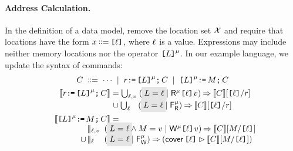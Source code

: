 \paragraph{Address Calculation.}
In the definition of a data model, remove the location set $\mathcal{X}$ and require
that locations have the form $x\!\!\;\mathrel{\mathord{\vcentcolon}\mkern-1mu\mathord{\vcentcolon}\mathord{{=}}}\;\!\!\texttt{[}\ell\texttt{]}$, where $\ell$
is a value.  Expressions may include neither memory locations nor the
operator $\texttt{[}L\texttt{]}^{\mu}$.
In our example language, we update the syntax of commands:
\begin{gather*}
  \aCmd
  \BNFDEF \cdots
  \BNFSEP \aReg\GETS\REF{\cExp}^{\amode}\SEMI \aCmd 
  \BNFSEP \REF{\cExp}^{\amode}\GETS\aExp\SEMI \aCmd
  \\
\begin{aligned}
  \sem{\aReg\GETS\REF{\cExp}^\amode\SEMI \aCmd} & =
  \textstyle\bigcup_{\cVal,\aVal}\; (\;\mathhl{\cExp=\cVal} \mid \DRmode{\REF{\cVal}}\aVal) \prefix \sem{\aCmd}[\REF{\cVal}/\aReg]  
  \\[-.5ex] & \mkern2mu\cup
  \textstyle\bigcup_{\cVal\phantom{,\aVal}}\; (\;\mathhl{\cExp=\cVal}\mid\DFR{\amode}) \prefix
  \sem{\aCmd}[\REF{\cVal}/\aReg]
  \\
  \sem{\REF{\cExp}^\amode\GETS\aExp\SEMI \aCmd} & =
  \\[-1ex]
  &\mkern-65mu\hbox to 0pt{$\begin{aligned}
    &\textstyle\parallel_{\cVal,\aVal}\;(\;\mathhl{\cExp=\cVal} \land \aExp=\aVal \mid \DWmode{\REF{\cVal}}\aVal) \prefix \sem{\aCmd}[\aExp/\REF{\cVal}]
    \\[-.5ex]  \cup\!&
    \textstyle\parallel_{\cVal\phantom{,\aVal}}\; (\;\mathhl{\cExp=\cVal}\mid\DFW{\amode}) \prefix
    (\relfilt{\REF{\cVal}} \sem{\aCmd}[\aExp/\REF{\cVal}])    
  \end{aligned}$}
\end{aligned}
\end{gather*}

